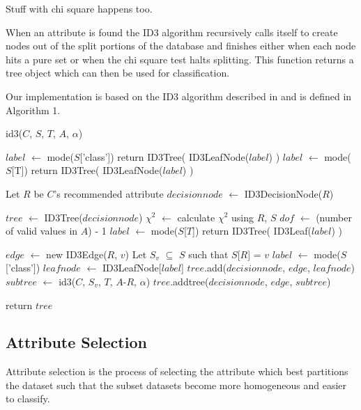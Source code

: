 \documentclass{IEEEtran}
\begin{document}
Stuff with chi square happens too.

When an attribute is found the ID3 algorithm recursively calls itself to
create nodes out of the split portions of the database and finishes
either when each node hits a pure set or when the chi square test
halts splitting. This function returns a tree object which can then be 
used for classification.

Our implementation is based on the ID3 algorithm described
in \parencite{quinlan1986induction} and is defined in Algorithm 1.


\begin{algorithm}
\label{id3algorithm}
\caption{id3($C$, $S$, $T$, $A$, $\alpha$)}
\begin{algorithmic}
\Statex {}
\Statex {}
\Statex {}
  \State $label$ $\leftarrow$ mode($S$['class'])
  \State return ID3Tree( ID3LeafNode($label$) )
\EndIf
{}
  \State $label$ $\leftarrow$ mode($S$[T])
  \State return ID3Tree( ID3LeafNode($label$) )
\EndIf

\State Let $R$ be $C$'s recommended attribute
\State $decisionnode$ $\leftarrow$ ID3DecisionNode($R$)

\State $tree$ $\leftarrow$ ID3Tree($decisionnode$)
  \State $\chi^2$ $\leftarrow$ calculate $\chi^2$ using $R$, $S$
  \State $dof$ $\leftarrow$ (number of valid values in $A$) - 1
    \State $label$ $\leftarrow$ mode($S$[$T$])
    \State return ID3Tree( ID3Leaf($label$) )
  \EndIf

  \State $edge$ $\leftarrow$ new ID3Edge($R$, $v$)
  \State Let $S_v$ $\subseteq$ $S$ such that $S$[$R$] = $v$
    \State $label$ $\leftarrow$ mode($S$['class'])
    \State $leafnode$ $\leftarrow$ ID3LeafNode[$label$]
    \State $tree$.add($decisionnode$, $edge$, $leafnode$)
  \Else
    \State $subtree$ $\leftarrow$ id3($C$, $S_v$, $T$, $A$-$R$, $\alpha$)
    \State $tree$.addtree($decisionnode$, $edge$, $subtree$)
  \EndIf

  return $tree$
\EndFor

\end{algorithmic}
\end{algorithm}


\subsection{Attribute Selection}
Attribute selection is the process of selecting the attribute which
best partitions the dataset such that the subset datasets become more
homogeneous and easier to classify.
\end{document}
